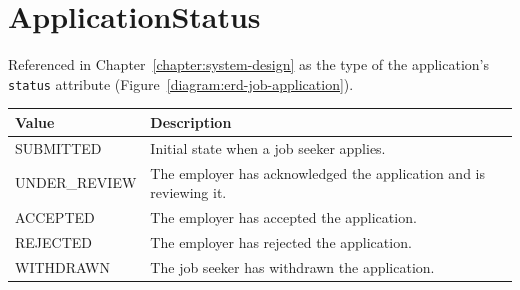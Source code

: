 \section{ApplicationStatus}

Referenced in Chapter~\ref{chapter:system-design} as the type of the application's \texttt{status} attribute (Figure~\ref{diagram:erd-job-application}).

\begin{tabular}{|l|p{9.8cm}|}
	\hline
	\textbf{Value} & \textbf{Description} \\
	\hline
	SUBMITTED & Initial state when a job seeker applies. \\
	\hline
	UNDER\_REVIEW & The employer has acknowledged the application and is reviewing it. \\
	\hline
	ACCEPTED & The employer has accepted the application. \\
	\hline
	REJECTED & The employer has rejected the application. \\
	\hline
	WITHDRAWN & The job seeker has withdrawn the application. \\
	\hline
\end{tabular}